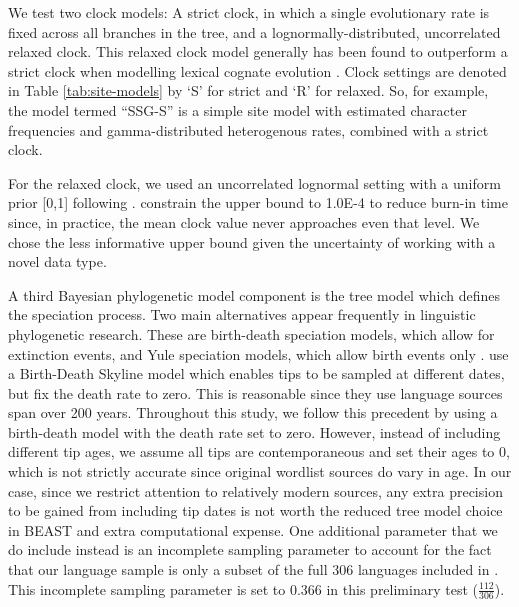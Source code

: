 \documentclass[]{article}
\begin{document}
We test two clock models: A strict clock, in which a single evolutionary rate is fixed across all branches in the tree, and a lognormally-distributed, uncorrelated relaxed clock. This relaxed clock model generally has been found to outperform a strict clock when modelling lexical cognate evolution \autocites{bouckaert_origin_2018}{kolipakam_bayesian_2018}. Clock settings are denoted in Table \ref{tab:site-models} by `S' for strict and `R' for relaxed. So, for example, the model termed ``SSG-S'' is a simple site model with estimated character frequencies and gamma-distributed heterogenous rates, combined with a strict clock.

For the relaxed clock, we used an uncorrelated lognormal setting with a uniform prior {[}0,1{]} following \textcite{kolipakam_bayesian_2018}. \textcite{bouckaert_origin_2018} constrain the upper bound to 1.0E-4 to reduce burn-in time since, in practice, the mean clock value never approaches even that level. We chose the less informative upper bound given the uncertainty of working with a novel data type.

A third Bayesian phylogenetic model component is the tree model which defines the speciation process. Two main alternatives appear frequently in linguistic phylogenetic research. These are birth-death speciation models, which allow for extinction events, and Yule speciation models, which allow birth events only \autocites[as preferred in][]{bowern_computational_2012}{kolipakam_bayesian_2018}. \textcite{bouckaert_origin_2018} use a Birth-Death Skyline model which enables tips to be sampled at different dates, but fix the death rate to zero. This is reasonable since they use language sources span over 200 years. Throughout this study, we follow this precedent by using a birth-death model with the death rate set to zero. However, instead of including different tip ages, we assume all tips are contemporaneous and set their ages to 0, which is not strictly accurate since original wordlist sources do vary in age. In our case, since we restrict attention to relatively modern sources, any extra precision to be gained from including tip dates is not worth the reduced tree model choice in BEAST and extra computational expense. One additional parameter that we do include instead is an incomplete sampling parameter to account for the fact that our language sample is only a subset of the full 306 languages included in \textcite{bouckaert_origin_2018}. This incomplete sampling parameter is set to 0.366 in this preliminary test (\(\frac{112}{306}\)).
\end{document}
